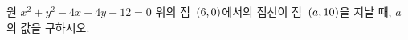 원 $x^2+y^2-4x+4y-12=0$ 위의 점~$(6{,}\mkern3mu\mathopen{}0)$에서의 접선이 점~$(a{,}\mkern3mu\mathopen{}10)$을 지날 때, $a$의 값을 구하시오.
